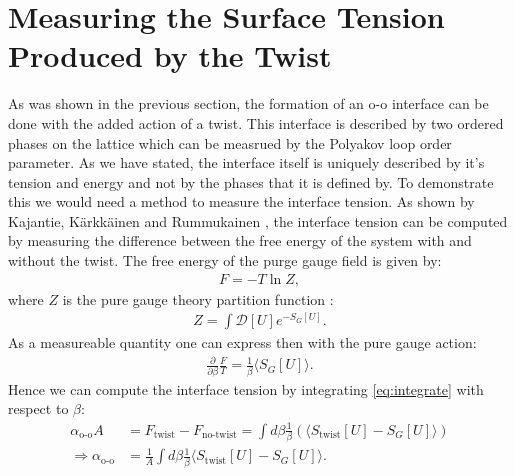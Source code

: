 \documentclass[english,twoside,openright]{UH_TCM_MSc}
\begin{document}
\section{Measuring the Surface Tension Produced by the Twist} \label{sec:twist_measure}

As was shown in the previous section, the formation of an o-o interface can be done with the added action of a twist. This interface is described by two ordered phases on the lattice which can be measrued by the Polyakov loop order parameter. As we have stated, the interface itself is uniquely described by it's tension and energy and not by the phases that it is defined by. To demonstrate this we would need a method to measure the interface tension. As shown by Kajantie, Kärkkäinen and Rummukainen \cite{twist}, the interface tension can be computed by measuring the difference between the free energy of the system with and without the twist. The free energy of the purge gauge field is given by:
\begin{align}
    F = -T\ln Z,
\end{align}
where $Z$ is the pure gauge theory partition function \cite{Rothe:1992nt}:
\begin{align}
    Z = \int \mathcal{D}[U] e^{-S_G[U]}.
\end{align}
As a measureable quantity one can express then with the pure gauge action:
\begin{align}
    \frac{\partial}{\partial\beta} \frac{F}{T} = \frac{1}{\beta}\langle S_G[U] \rangle. \label{eq:integrate}
\end{align}
Hence we can compute the interface tension by integrating \ref{eq:integrate} with respect to $\beta$:
\begin{align*}
   \alpha_{\text{o-o}}A &= F_{\text{twist}} - F_{\text{no-twist}} = \int d\beta \frac{1}{\beta}(\langle S_{\text{twist}}[U] - S_G[U]\rangle) \\
   \Rightarrow \alpha_{\text{o-o}} &= \frac{1}{A}\int d\beta \frac{1}{\beta}\langle S_{\text{twist}}[U] - S_G[U]\rangle.
\end{align*}
\end{document}
